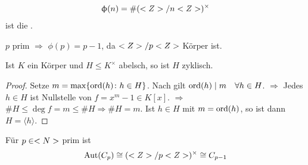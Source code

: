 \begin{definition}
	\begin{align}
		\upphi(n) = \#(<Z>/n<Z>)^\times\notag
	\end{align}
	ist die .
\end{definition}

\begin{example}
	$p$ prim $\Rightarrow$ $\phi(p) = p-1$, da $<Z> / p<Z>$ Körper ist.
\end{example}

\begin{proposition}
	Ist $K$ ein Körper und $H\leq K^{\times}$ abelsch, so ist $H$ zyklisch.
\end{proposition}
\begin{proof}
	Setze $m=\max\{\operatorname{ord}(h) \colon h \in H\}$. Nach  gilt $\operatorname{ord}(h) \mid m \quad\forall h \in H$. $\Rightarrow$ Jedes $h \in H$ ist Nullstelle von $f = x^m -1 \in K[x]$. $\Rightarrow$ $\# H \leq \deg f = m \leq \# H \Rightarrow \# H = m$. Ist $h \in H$ mit $m = \operatorname{ord}(h)$, so ist dann $H = \langle h \rangle$.
\end{proof}

\begin{conclusion}
	Für $p \in <N>$ prim ist
	\begin{align}
		\operatorname{Aut}(C_p) \cong (<Z> / p <Z>)^{\times} \cong C_{p-1}\notag
	\end{align}
\end{conclusion}